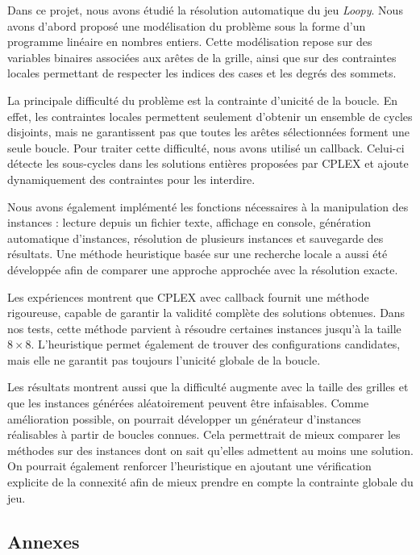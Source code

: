 Dans ce projet, nous avons étudié la résolution automatique du jeu \textit{Loopy}. Nous avons d'abord proposé une modélisation du problème sous la forme d'un programme linéaire en nombres entiers. Cette modélisation repose sur des variables binaires associées aux arêtes de la grille, ainsi que sur des contraintes locales permettant de respecter les indices des cases et les degrés des sommets.

La principale difficulté du problème est la contrainte d'unicité de la boucle. En effet, les contraintes locales permettent seulement d'obtenir un ensemble de cycles disjoints, mais ne garantissent pas que toutes les arêtes sélectionnées forment une seule boucle. Pour traiter cette difficulté, nous avons utilisé un callback. Celui-ci détecte les sous-cycles dans les solutions entières proposées par CPLEX et ajoute dynamiquement des contraintes pour les interdire.

Nous avons également implémenté les fonctions nécessaires à la manipulation des instances : lecture depuis un fichier texte, affichage en console, génération automatique d'instances, résolution de plusieurs instances et sauvegarde des résultats. Une méthode heuristique basée sur une recherche locale a aussi été développée afin de comparer une approche approchée avec la résolution exacte.

Les expériences montrent que CPLEX avec callback fournit une méthode rigoureuse, capable de garantir la validité complète des solutions obtenues. Dans nos tests, cette méthode parvient à résoudre certaines instances jusqu'à la taille \(8 \times 8\). L'heuristique permet également de trouver des configurations candidates, mais elle ne garantit pas toujours l'unicité globale de la boucle.

Les résultats montrent aussi que la difficulté augmente avec la taille des grilles et que les instances générées aléatoirement peuvent être infaisables. Comme amélioration possible, on pourrait développer un générateur d'instances réalisables à partir de boucles connues. Cela permettrait de mieux comparer les méthodes sur des instances dont on sait qu'elles admettent au moins une solution. On pourrait également renforcer l'heuristique en ajoutant une vérification explicite de la connexité afin de mieux prendre en compte la contrainte globale du jeu.



\subsection{Annexes}

